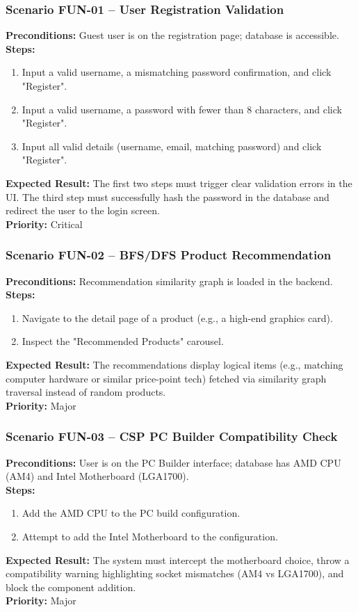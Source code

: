 \documentclass[12pt,a4paper]{article}
\begin{document}
\subsubsection*{Scenario FUN-01 – User Registration Validation}
\textbf{Preconditions:} Guest user is on the registration page; database is accessible.\\
\textbf{Steps:}
\begin{enumerate}
\item Input a valid username, a mismatching password confirmation, and click "Register".
\item Input a valid username, a password with fewer than 8 characters, and click "Register".
\item Input all valid details (username, email, matching password) and click "Register".
\end{enumerate}
\textbf{Expected Result:} The first two steps must trigger clear validation errors in the UI. The third step must successfully hash the password in the database and redirect the user to the login screen.\\
\textbf{Priority:} Critical

\subsubsection*{Scenario FUN-02 – BFS/DFS Product Recommendation}
\textbf{Preconditions:} Recommendation similarity graph is loaded in the backend.\\
\textbf{Steps:}
\begin{enumerate}
\item Navigate to the detail page of a product (e.g., a high-end graphics card).
\item Inspect the "Recommended Products" carousel.
\end{enumerate}
\textbf{Expected Result:} The recommendations display logical items (e.g., matching computer hardware or similar price-point tech) fetched via similarity graph traversal instead of random products.\\
\textbf{Priority:} Major

\subsubsection*{Scenario FUN-03 – CSP PC Builder Compatibility Check}
\textbf{Preconditions:} User is on the PC Builder interface; database has AMD CPU (AM4) and Intel Motherboard (LGA1700).\\
\textbf{Steps:}
\begin{enumerate}
\item Add the AMD CPU to the PC build configuration.
\item Attempt to add the Intel Motherboard to the configuration.
\end{enumerate}
\textbf{Expected Result:} The system must intercept the motherboard choice, throw a compatibility warning highlighting socket mismatches (AM4 vs LGA1700), and block the component addition.\\
\textbf{Priority:} Major
\end{document}
